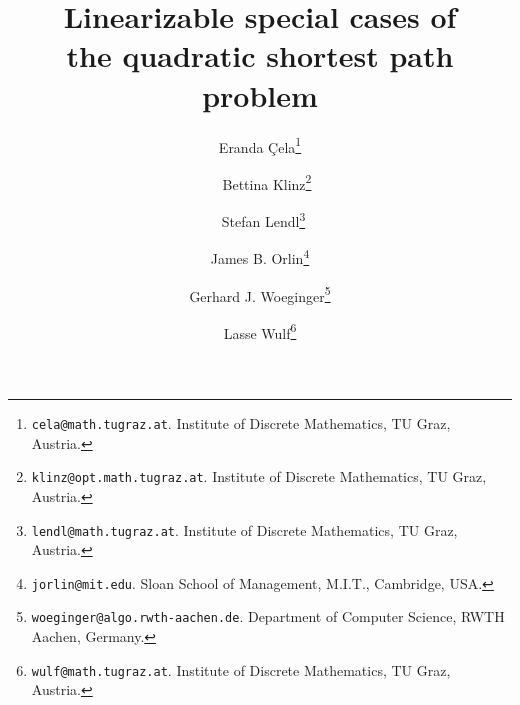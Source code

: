 \documentclass[11pt,fleqn]{article}
\begin{document}
\sloppy
\newtheorem{axiom}{Axiom}[section]
\newtheorem{conjecture}[axiom]{Conjecture}
\newtheorem{corollary}[axiom]{Corollary}
\newtheorem{definition}[axiom]{Definition}
\newtheorem{example}[axiom]{Example}
\newtheorem{fact}[axiom]{Fact}
\newtheorem{lemma}[axiom]{Lemma}
\newtheorem{observation}[axiom]{Observation}
\newtheorem{proposition}[axiom]{Proposition}
\newtheorem{theorem}[axiom]{Theorem}

\renewcommand{\topfraction}{1.0}
\renewcommand{\bottomfraction}{1.0}

\newcommand{\proof}{\emph{Proof.}\ \ }
\newcommand{\qed}{~~$\Box$}
\newcommand{\RRR}{{\mathbb{R}_{\ge0}}}

\newcommand{\spp}{\text{SPP}}
\newcommand{\qspp}{\text{QSPP}}
\newcommand{\ppp}{{\cal P}_{st}}
\newcommand{\pppx}{{\cal P}^+}
\newcommand{\pppy}{{\cal P}^-}

\newcommand{\boxxx}[1]
 {\fbox{\begin{minipage}{13.00cm}\begin{center}\bigskip\begin{minipage}{12.30cm}
  #1\end{minipage}\end{center}~\end{minipage}}}


\title{{\bf Linearizable special cases of\\the quadratic shortest path problem}}
\author{
\sc Eranda \c{C}ela\thanks{{\tt cela@math.tugraz.at}.
Institute of Discrete Mathematics, TU Graz, Austria.}
\and
\sc ~~Bettina Klinz\thanks{{\tt klinz@opt.math.tugraz.at}.
Institute of Discrete Mathematics, TU Graz, Austria.}
\and
\sc ~Stefan Lendl\thanks{{\tt lendl@math.tugraz.at}.
Institute of Discrete Mathematics, TU Graz, Austria.}
\and
\sc James B. Orlin\thanks{{\tt jorlin@mit.edu}.
Sloan School of Management, M.I.T., Cambridge, USA.}
\and
\sc Gerhard J. Woeginger\thanks{{\tt woeginger@algo.rwth-aachen.de}.
Department of Computer Science, RWTH Aachen, Germany.}
\and
\sc Lasse Wulf\thanks{{\tt wulf@math.tugraz.at}.
Institute of Discrete Mathematics, TU Graz, Austria.}
}
\date{}
\maketitle
\end{document}
